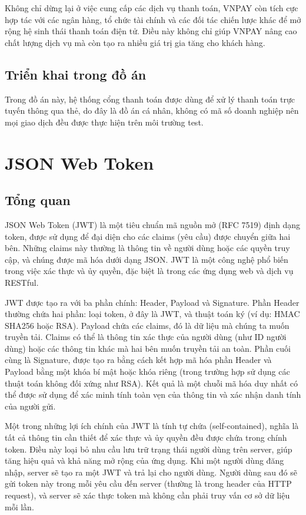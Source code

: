 \documentclass[../DoAn.tex]{subfiles}
\begin{document}
Không chỉ dừng lại ở việc cung cấp các dịch vụ thanh toán, VNPAY còn tích cực hợp tác với các ngân hàng, tổ chức tài chính và các đối tác chiến lược khác để mở rộng hệ sinh thái thanh toán điện tử. Điều này không chỉ giúp VNPAY nâng cao chất lượng dịch vụ mà còn tạo ra nhiều giá trị gia tăng cho khách hàng.
\subsection{Triển khai trong đồ án}
\label{subsection:3.4.2}
Trong đồ án này, hệ thống cổng thanh toán được dùng để xử lý thanh toán trực tuyến thông qua thẻ, do đây là đồ án cá nhân, không có mã số doanh nghiệp nên mọi giao dịch đều được thực hiện trên môi trường test.

\section{JSON Web Token}
\label{section 3.5}
\subsection{Tổng quan}
\label{subsection:3.5.1}
JSON Web Token (JWT) là một tiêu chuẩn mã nguồn mở (RFC 7519) định dạng token, được sử dụng để đại diện cho các claims (yêu cầu) được chuyển giữa hai bên. Những claims này thường là thông tin về người dùng hoặc các quyền truy cập, và chúng được mã hóa dưới dạng JSON. JWT là một công nghệ phổ biến trong việc xác thực và ủy quyền, đặc biệt là trong các ứng dụng web và dịch vụ RESTful.

JWT được tạo ra với ba phần chính: Header, Payload và Signature. Phần Header thường chứa hai phần: loại token, ở đây là JWT, và thuật toán ký (ví dụ: HMAC SHA256 hoặc RSA). Payload chứa các claims, đó là dữ liệu mà chúng ta muốn truyền tải. Claims có thể là thông tin xác thực của người dùng (như ID người dùng) hoặc các thông tin khác mà hai bên muốn truyền tải an toàn. Phần cuối cùng là Signature, được tạo ra bằng cách kết hợp mã hóa phần Header và Payload bằng một khóa bí mật hoặc khóa riêng (trong trường hợp sử dụng các thuật toán không đối xứng như RSA). Kết quả là một chuỗi mã hóa duy nhất có thể được sử dụng để xác minh tính toàn vẹn của thông tin và xác nhận danh tính của người gửi.

Một trong những lợi ích chính của JWT là tính tự chứa (self-contained), nghĩa là tất cả thông tin cần thiết để xác thực và ủy quyền đều được chứa trong chính token. Điều này loại bỏ nhu cầu lưu trữ trạng thái người dùng trên server, giúp tăng hiệu quả và khả năng mở rộng của ứng dụng. Khi một người dùng đăng nhập, server sẽ tạo ra một JWT và trả lại cho người dùng. Người dùng sau đó sẽ gửi token này trong mỗi yêu cầu đến server (thường là trong header của HTTP request), và server sẽ xác thực token mà không cần phải truy vấn cơ sở dữ liệu mỗi lần.
\end{document}
